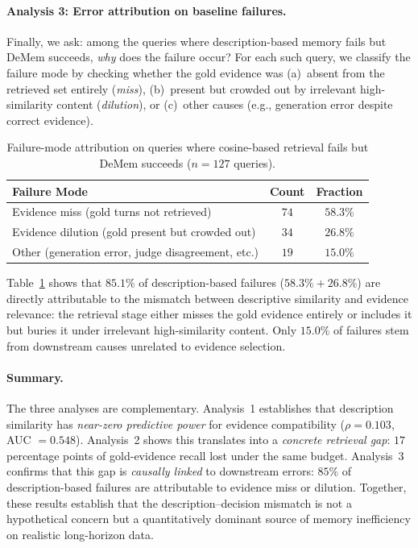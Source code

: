 \documentclass{article}
\theoremstyle{plain}
\theoremstyle{definition}
\theoremstyle{remark}
\begin{document}
\paragraph{Analysis 3: Error attribution on baseline failures.}

Finally, we ask: among the queries where description-based memory
fails but DeMem succeeds, \emph{why} does the failure occur?
For each such query, we classify the failure mode by checking whether
the gold evidence was (a)~absent from the retrieved set entirely
(\emph{miss}), (b)~present but crowded out by irrelevant
high-similarity content (\emph{dilution}), or (c)~other causes
(e.g., generation error despite correct evidence).

\begin{table}[h]
\centering
\caption{Failure-mode attribution on queries where cosine-based
  retrieval fails but DeMem succeeds ($n = 127$ queries).}
\label{tab:error-attribution}
\small
\begin{tabular}{lcc}
\toprule
Failure Mode & Count & Fraction \\
\midrule
Evidence miss (gold turns not retrieved)
  & $74$ & $58.3\%$ \\
Evidence dilution (gold present but crowded out)
  & $34$ & $26.8\%$ \\
Other (generation error, judge disagreement, etc.)
  & $19$ & $15.0\%$ \\
\bottomrule
\end{tabular}
\end{table}

\noindent
Table~\ref{tab:error-attribution} shows that $85.1\%$ of
description-based failures ($58.3\% + 26.8\%$) are directly
attributable to the mismatch between descriptive similarity and
evidence relevance: the retrieval stage either misses the gold
evidence entirely or includes it but buries it under irrelevant
high-similarity content. Only $15.0\%$ of failures stem from
downstream causes unrelated to evidence selection.

\paragraph{Summary.}
The three analyses are complementary. Analysis~1 establishes that
description similarity has \emph{near-zero predictive power} for
evidence compatibility ($\rho = 0.103$, AUC $= 0.548$). Analysis~2
shows this translates into a \emph{concrete retrieval gap}: $17$
percentage points of gold-evidence recall lost under the same budget.
Analysis~3 confirms that this gap is \emph{causally linked} to
downstream errors: $85\%$ of description-based failures are
attributable to evidence miss or dilution. Together, these results
establish that the description--decision mismatch is not a
hypothetical concern but a quantitatively dominant source of memory
inefficiency on realistic long-horizon data.
\end{document}

